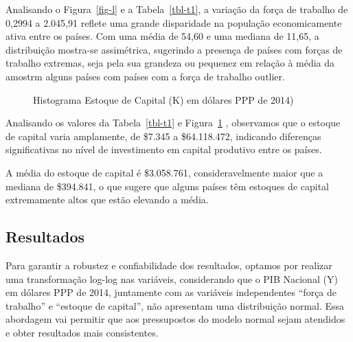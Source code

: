 \documentclass[
  letterpaper,
  DIV=11,
  numbers=noendperiod]{scrreprt}
\begin{document}
Analisando o Figura~\ref{fig-l} e a Tabela~\ref{tbl-t1}, a variação da
força de trabalho de 0,2994 a 2.045,91 reflete uma grande disparidade na
população economicamente ativa entre os países. Com uma média de 54,60 e
uma mediana de 11,65, a distribuição mostra-se assimétrica, sugerindo a
presença de países com forças de trabalho extremas, seja pela sua
grandeza ou pequenez em relação à média da amostrm alguns países com
países com a força de trabalho outlier.

\begin{figure}

\caption{\label{fig-k}Histograma Estoque de Capital (K) em dólares PPP
de 2014)}


\end{figure}%

Analisando os valores da Tabela~\ref{tbl-t1} e Figura~\ref{fig-k} ,
observamos que o estoque de capital varia amplamente, de \$7.345 a
\$64.118.472, indicando diferenças significativas no nível de
investimento em capital produtivo entre os países.

A média do estoque de capital é \$3.058.761, consideravelmente maior que
a mediana de \$394.841, o que sugere que alguns países têm estoques de
capital extremamente altos que estão elevando a média.

\subsection{Resultados}\label{resultados}

Para garantir a robustez e confiabilidade dos resultados, optamos por
realizar uma transformação log-log nas variáveis, considerando que o PIB
Nacional (Y) em dólares PPP de 2014, juntamente com as variáveis
independentes ``força de trabalho'' e ``estoque de capital'', não
apresentam uma distribuição normal. Essa abordagem vai permitir que aos
pressupostos do modelo normal sejam atendidos e obter resultados mais
consistentes.
\end{document}
